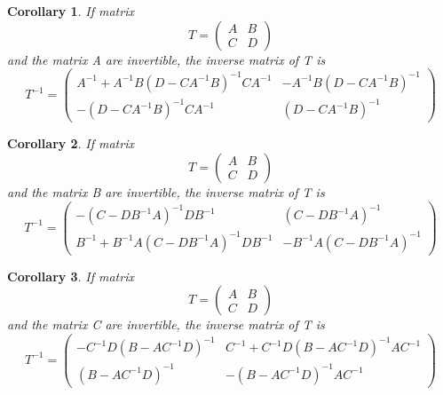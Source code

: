 \documentclass{article}
\newtheorem{corollary}{Corollary}
\begin{document}
    \begin{corollary}
        If matrix
        $$
            T = 
            \begin{pmatrix}
                A & B \\
                C & D
            \end{pmatrix}
        $$
        and the matrix A are invertible, the inverse matrix of T is
        $$
            T^{-1} = 
            \begin{pmatrix}
                A^{-1} + A^{-1} B (D - C A^{-1} B)^{-1} C A^{-1} & -A^{-1} B (D - C A^{-1} B)^{-1} \\
                -(D - C A^{-1} B)^{-1} C A^{-1} & (D - C A^{-1} B)^{-1}
            \end{pmatrix}
        $$
    \end{corollary}
    
    \begin{corollary}
        If matrix
        $$
            T = 
            \begin{pmatrix}
                A & B \\
                C & D
            \end{pmatrix}
        $$
        and the matrix B are invertible, the inverse matrix of T is
        $$
            T^{-1} = 
            \begin{pmatrix}
                -(C - D B^{-1} A)^{-1} D B^{-1} & (C - D B^{-1} A)^{-1} \\
                B^{-1} + B^{-1} A (C - D B^{-1} A)^{-1} D B^{-1} & -B^{-1} A (C - D B^{-1} A)^{-1}
            \end{pmatrix}
        $$
    \end{corollary}
    
    \begin{corollary}
         If matrix
        $$
            T = 
            \begin{pmatrix}
                A & B \\
                C & D
            \end{pmatrix}
        $$
        and the matrix C are invertible, the inverse matrix of T is
        $$
            T^{-1} = 
            \begin{pmatrix}
                -C^{-1} D (B - A C^{-1} D)^{-1} & C^{-1} + C^{-1} D (B - A C^{-1} D)^{-1} A C^{-1} \\
                (B - A C^{-1} D)^{-1} & -(B - A C^{-1} D)^{-1} A C^{-1}
            \end{pmatrix}
        $$
    \end{corollary}
    
\end{document}
